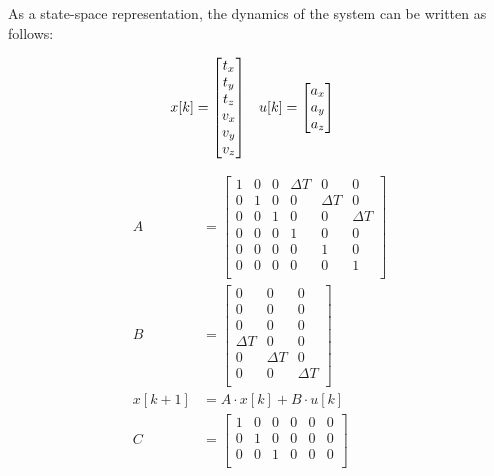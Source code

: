 \documentclass[bare_jrnl_transmag]{subfiles}
\begin{document}
As a state-space representation, the dynamics of the system can be written as follows:

\begin{align*}
    x[k] &= {\null\hbox{$\begin{bmatrix}
    t_x \\
    t_y \\
    t_z \\
    v_x \\
    v_y \\
    v_z
    \end{bmatrix}$}}
    \quad
    u[k] = {\null\hbox{$\begin{bmatrix}
    a_x \\
    a_y \\
    a_z
    \end{bmatrix}$}}
\end{align*}

\begin{align*}
    A &= 
    \begin{bmatrix}
    1 & 0 & 0 & \Delta T & 0 & 0 \\
    0 & 1 & 0 & 0 & \Delta T & 0 \\
    0 & 0 & 1 & 0 & 0 & \Delta T \\
    0 & 0 & 0 & 1 & 0 & 0 \\
    0 & 0 & 0 & 0 & 1 & 0 \\
    0 & 0 & 0 & 0 & 0 & 1 \\
    \end{bmatrix}
    \\[1em]
    B &=
    \begin{bmatrix}
    0 & 0 & 0 \\
    0 & 0 & 0 \\
    0 & 0 & 0 \\
    \Delta T & 0 & 0 \\
    0 & \Delta T & 0 \\
    0 & 0 & \Delta T \\
    \end{bmatrix}
    \\[1em]
    x[k+1] &= A \cdot x[k] + B \cdot u[k]
    \\[1em]
    C &=
    \begin{bmatrix}
    1 & 0 & 0 & 0 & 0 & 0 \\
    0 & 1 & 0 & 0 & 0 & 0 \\
    0 & 0 & 1 & 0 & 0 & 0 \\
    \end{bmatrix}
\end{align*}
\end{document}
